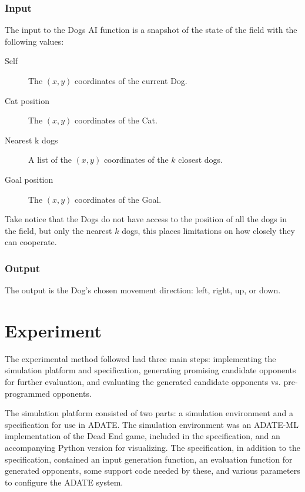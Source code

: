 \subsubsection{Input}
\label{sec:input}

The input to the Dogs AI function is a snapshot of the state of the field with
the following values:

\begin{description}
\item[Self] The \((x,y)\) coordinates of the current Dog.
\item[Cat position] The \((x,y)\) coordinates of the Cat.
\item[Nearest k dogs] A list of the \((x,y)\) coordinates of the \(k\) closest
  dogs.
\item[Goal position] The \((x,y)\) coordinates of the Goal.
\end{description}

Take notice that the Dogs do not have access to the position of all the dogs in
the field, but only the nearest \(k\) dogs, this places limitations on how
closely they can cooperate.

\subsubsection{Output}
\label{sec:output}

The output is the Dog's chosen movement direction: left, right, up, or down.


\section{Experiment}
\label{sec:experiment}

 The experimental
method followed had three main steps: implementing the simulation platform and
specification, generating promising candidate opponents for further evaluation,
and evaluating the generated candidate opponents vs. pre-programmed opponents.

The simulation platform consisted of two parts: a simulation environment and a
specification for use in ADATE. The simulation environment was an ADATE-ML
implementation of the Dead End game, included in the specification, and an
accompanying Python version for visualizing. The specification, in addition to
the specification, contained an input generation function, an evaluation
function for generated opponents, some support code needed by these, and various
parameters to configure the ADATE system.

